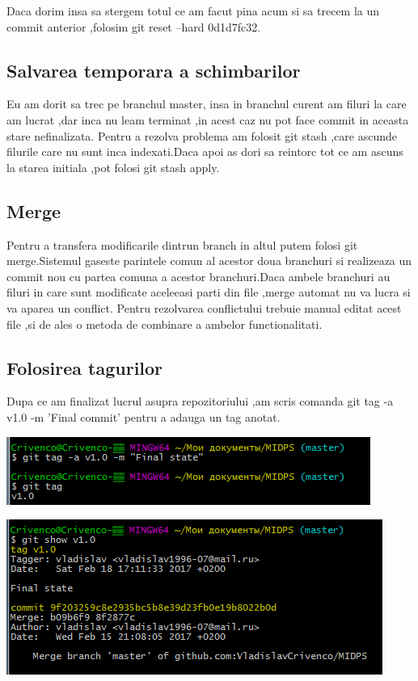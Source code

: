 \documentclass[a4paper, 12pt]{article}
\begin{document}
Daca dorim insa sa stergem totul ce am facut pina acum si sa trecem la un commit anterior ,folosim git reset --hard 0d1d7fc32.

\subsection{Salvarea temporara a schimbarilor}
Eu am dorit sa trec pe branchul master, insa in branchul curent am filuri la care am lucrat ,dar inca nu leam terminat ,in acest caz nu pot face commit in aceasta stare nefinalizata. Pentru a rezolva problema am folosit git stash ,care ascunde filurile care nu sunt inca indexati.Daca apoi as dori sa reintorc tot ce am ascuns la starea initiala ,pot folosi git stash apply.

\subsection{Merge}
Pentru a transfera  modificarile dintrun branch in altul putem folosi git merge.Sistemul  gaseste parintele comun al acestor doua branchuri si realizeaza un commit nou cu partea comuna a acestor branchuri.Daca ambele branchuri au filuri in care sunt modificate aceleeasi parti din file ,merge automat nu va lucra si va aparea un conflict.
Pentru rezolvarea conflictului trebuie manual editat acest file ,si de ales o metoda de combinare a ambelor functionalitati.

\subsection{Folosirea tagurilor}
Dupa ce am finalizat lucrul asupra repozitoriului ,am scris comanda git tag -a v1.0 -m 'Final commit' pentru a adauga un tag anotat.

\includegraphics*{gittag}

\includegraphics*{git_tag_show}
\end{document}
